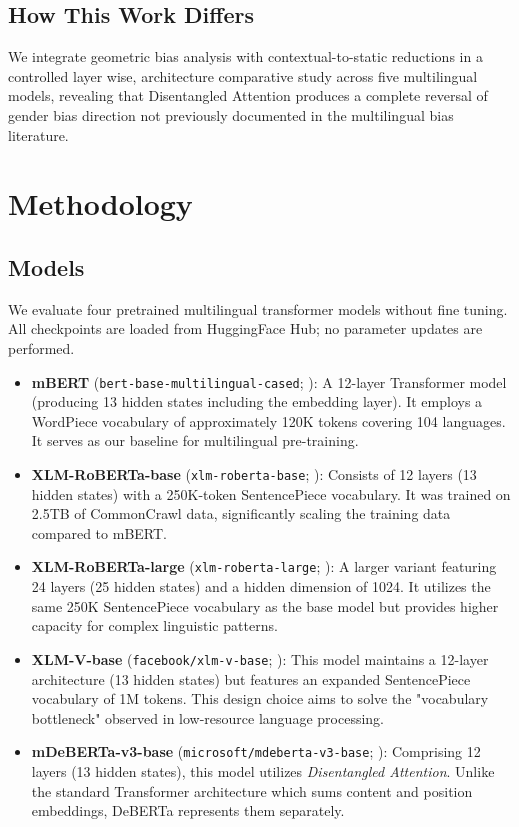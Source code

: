 \documentclass[english, a4paper, 11.5pt, twoside]{article}
\begin{document}
\subsection{How This Work Differs}
We integrate geometric bias analysis  \textcite{Bolukbasi:2016} with contextual-to-static reductions \textcite{Bommasani:2020} in a controlled layer wise, architecture comparative study across five multilingual models, revealing that Disentangled Attention produces a complete reversal of gender bias direction not previously documented in the multilingual bias literature.


\section{Methodology}\label{section-methodology}

\subsection{Models}
We evaluate four pretrained multilingual transformer models without fine tuning. All checkpoints are loaded from HuggingFace Hub; no parameter updates are performed.
\begin{itemize}
    \item \textbf{mBERT} (\texttt{bert-base-multilingual-cased}; \cite{Devlin:2019}): 
    A 12-layer Transformer model (producing 13 hidden states including the embedding layer). It employs a WordPiece vocabulary of approximately 120K tokens covering 104 languages. It serves as our baseline for multilingual pre-training.

    \item \textbf{XLM-RoBERTa-base} (\texttt{xlm-roberta-base}; \cite{Conneau:2020}): 
    Consists of 12 layers (13 hidden states) with a 250K-token SentencePiece vocabulary. It was trained on 2.5TB of CommonCrawl data, significantly scaling the training data compared to mBERT.

    \item \textbf{XLM-RoBERTa-large} (\texttt{xlm-roberta-large}; \cite{Conneau:2020}): 
    A larger variant featuring 24 layers (25 hidden states) and a hidden dimension of 1024. It utilizes the same 250K SentencePiece vocabulary as the base model but provides higher capacity for complex linguistic patterns.

    \item \textbf{XLM-V-base} (\texttt{facebook/xlm-v-base}; \cite{Liang:2023}): 
    This model maintains a 12-layer architecture (13 hidden states) but features an expanded SentencePiece vocabulary of 1M tokens. This design choice aims to solve the "vocabulary bottleneck" observed in low-resource language processing.

    \item \textbf{mDeBERTa-v3-base} (\texttt{microsoft/mdeberta-v3-base}; \cite{He:2023}): 
    Comprising 12 layers (13 hidden states), this model utilizes \textit{Disentangled Attention}. Unlike the standard Transformer architecture which sums content and position embeddings, DeBERTa represents them separately. 

\end{itemize}
\end{document}
